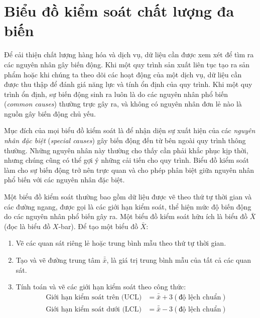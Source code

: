 \newpage
\section{Biểu đồ kiểm soát chất lượng đa biến}
\label{sec:ch05-06}

Để cải thiện chất lượng hàng hóa và dịch vụ, dữ liệu cần được xem xét để tìm ra các nguyên nhân gây biến động. Khi một quy trình sản xuất liên tục tạo ra sản phẩm hoặc khi chúng ta theo dõi các hoạt động của một dịch vụ, dữ liệu cần được thu thập để đánh giá năng lực và tính ổn định của quy trình. Khi một quy trình ổn định, sự biến động sinh ra luôn là do các nguyên nhân phổ biến (\textit{common causes}) thường trực gây ra, và không có nguyên nhân đơn lẻ nào là nguồn gây biến động chủ yếu.

Mục đích của mọi biểu đồ kiểm soát là để nhận diện sự xuất hiện của các \textit{nguyên nhân đặc biệt} (\textit{special causes}) gây biến động đến từ bên ngoài quy trình thông thường. Những nguyên nhân này thường cho thấy cần phải khắc phục kịp thời, nhưng chúng cũng có thể gợi ý những cải tiến cho quy trình. Biểu đồ kiểm soát làm cho sự biến động trở nên trực quan và cho phép phân biệt giữa nguyên nhân phổ biến với các nguyên nhân đặc biệt.

Một biểu đồ kiểm soát thường bao gồm dữ liệu được vẽ theo thứ tự thời gian và các đường ngang, được gọi là các giới hạn kiểm soát, thể hiện mức độ biến động do các nguyên nhân phổ biến gây ra. Một biểu đồ kiểm soát hữu ích là biểu đồ $\bar{X}$ (đọc là biểu đồ $X$-bar). Để tạo một biểu đồ $\bar{X}$:

\begin{enumerate}
    \item[\textbf{1.}] Vẽ các quan sát riêng lẻ hoặc trung bình mẫu theo thứ tự thời gian.
    \item[\textbf{2.}] Tạo và vẽ đường trung tâm $\bar{\bar{x}}$, là giá trị trung bình mẫu của tất cả các quan sát.
    \item[\textbf{3.}] Tính toán và vẽ các giới hạn kiểm soát theo công thức:
    \begin{align*}
        \text{Giới hạn kiểm soát trên (UCL)} &= \bar{\bar{x}} + 3(\text{độ lệch chuẩn}) \\
        \text{Giới hạn kiểm soát dưới (LCL)} &= \bar{\bar{x}} - 3(\text{độ lệch chuẩn})
    \end{align*}
\end{enumerate}

